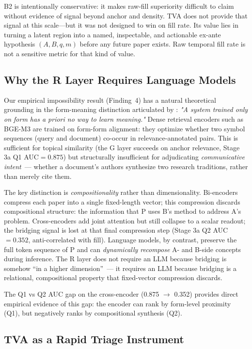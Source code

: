 \documentclass[11pt,twocolumn]{article}
\newcommand{\tva}{\textsf{TVA}}
\begin{document}
B2 is intentionally conservative: it makes raw-fill superiority difficult to claim
without evidence of signal beyond anchor and density.
\tva{} does not provide that signal at this scale---but it was not designed to win
on fill rate. Its value lies in turning a latent region into a named, inspectable,
and actionable ex-ante hypothesis $(A,B,q,m)$ before any future paper exists.
Raw temporal fill rate is not a sensitive metric for that kind of value.

\subsection{Why the R Layer Requires Language Models}

Our empirical impossibility result (Finding~4) has a natural theoretical grounding
in the form-meaning distinction articulated by \cite{bender2020climbing}:
\emph{"A system trained only on form has a priori no way to learn meaning."}
Dense retrieval encoders such as BGE-M3 are trained on form-form alignment: they
optimize whether two symbol sequences (query and document) co-occur in relevance-annotated
pairs. This is sufficient for topical similarity (the G layer succeeds on anchor
relevance, Stage 3a Q1 AUC$=0.875$) but structurally insufficient for adjudicating
\emph{communicative intent}~--- whether a document's authors synthesize two research
traditions, rather than merely cite them.

The key distinction is \emph{compositionality} rather than dimensionality.
Bi-encoders compress each paper into a single fixed-length vector; this compression
discards compositional structure: the information that P uses B's method to address
A's problem.
Cross-encoders add joint attention but still collapse to a scalar readout; the
bridging signal is lost at that final compression step (Stage 3a Q2 AUC$=0.352$,
anti-correlated with fill).
Language models, by contrast, preserve the full token sequence of P and can
\emph{dynamically recompose} A- and B-side concepts during inference.
The R layer does not require an LLM because bridging is somehow ``in a higher
dimension''~--- it requires an LLM because bridging is a relational, compositional
property that fixed-vector compression discards.

The Q1 vs Q2 AUC gap on the cross-encoder (0.875 $\to$ 0.352) provides direct
empirical evidence of this gap: the encoder can rank by form-level proximity
(Q1), but negatively ranks by compositional synthesis (Q2).

\subsection{TVA as a Rapid Triage Instrument}
\end{document}
